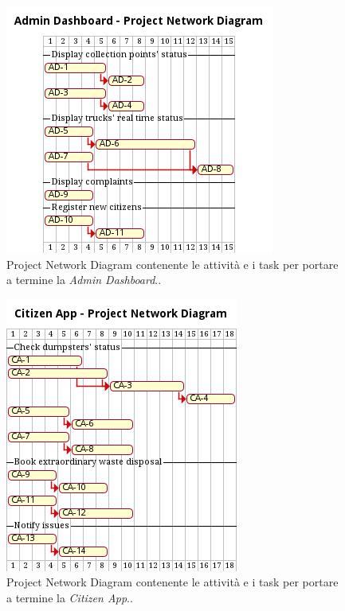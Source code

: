 \begin{figure}[H]
    \centering
    \includegraphics[width=\textwidth]{../img/gantt-admin-dashboard.pm}
    \caption{Project Network Diagram contenente le attività e i task per portare a termine la \textit{Admin Dashboard}..}
    \label{fig:gantt-admin-dashboard}
\end{figure}

\begin{figure}[H]
    \centering
    \includegraphics[width=\textwidth]{../img/gantt-citizen-app.pm}
    \caption{Project Network Diagram contenente le attività e i task per portare a termine la \textit{Citizen App}..}
    \label{fig:gantt-citizen-app}
\end{figure}

